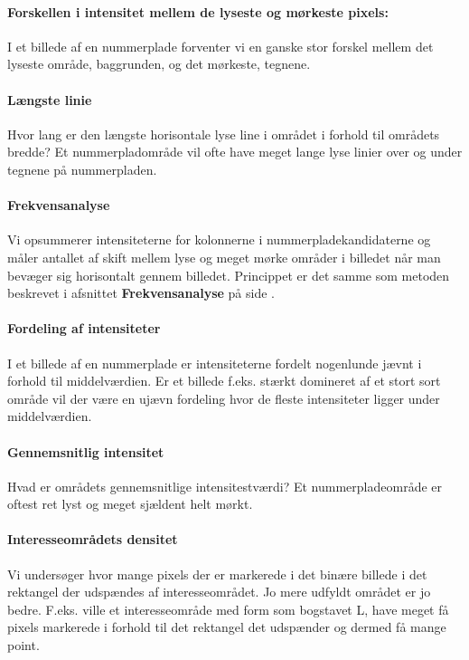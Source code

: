 \paragraph*{Forskellen i intensitet mellem de lyseste og mørkeste pixels:}
I et billede af en nummerplade forventer vi en ganske stor forskel mellem det lyseste område, baggrunden, og det mørkeste, tegnene.

\paragraph*{Længste linie}
Hvor lang er den længste horisontale lyse line i området i forhold til områdets bredde? Et nummerpladområde vil ofte have meget lange lyse linier over og under tegnene på nummerpladen.

\paragraph*{Frekvensanalyse}
Vi opsummerer intensiteterne for kolonnerne i nummerpladekandidaterne og måler antallet af skift mellem lyse og meget mørke områder i billedet når man bevæger sig horisontalt gennem billedet. Princippet er det samme som metoden beskrevet i afsnittet \textbf{Frekvensanalyse} på side \pageref{sec:DetectPlateness}. 

\paragraph*{Fordeling af intensiteter}
I et billede af en nummerplade er intensiteterne fordelt nogenlunde jævnt i forhold til middelværdien. Er et billede f.eks. stærkt domineret af et stort sort område vil der være en ujævn fordeling hvor de fleste intensiteter ligger under middelværdien.

\paragraph*{Gennemsnitlig intensitet}
Hvad er områdets gennemsnitlige intensitestværdi? Et nummerpladeområde er oftest ret lyst og meget sjældent helt mørkt. 

\paragraph*{Interesseområdets densitet}
Vi undersøger hvor mange pixels der er markerede i det binære billede i det rektangel der udspændes af interesseområdet. Jo mere udfyldt området er jo bedre. F.eks. ville et interesseområde med form som bogstavet L, have meget få pixels markerede i forhold til det rektangel det udspænder og dermed få mange point.


